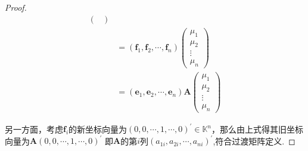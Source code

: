 {\begin{proof}
\begin{align*}
\begin{pmatrix}
                                                                         \end{pmatrix} \\
                        & =\left(\bm{f}_1,\bm{f}_2,\cdots,\bm{f}_n\right)
            \begin{pmatrix}
                \mu_1 \\\mu_2\\\vdots\\\mu_n
            \end{pmatrix}                                                                          \\
                        & =\left(\bm{e}_1,\bm{e}_2,\cdots,\bm{e}_n\right)\bm{A}
            \begin{pmatrix}
                \mu_1 \\\mu_2\\\vdots\\\mu_n
            \end{pmatrix}
        \end{align*}

        另一方面，考虑$\bm{f}_i$的新坐标向量为$\left(0,0,\cdots,1,\cdots,0\right)^{\prime}\in \mathbb{K}^n$，那么由上式得其旧坐标向量为$\bm{A}\left(0,0,\cdots,1,\cdots,0
            \right)^{\prime}
        $
        即$\bm{A}$的第$i$列$\left(
            a_{1i},a_{2i},\cdots,a_{ni}
            \right)^{\prime}$,符合过渡矩阵定义.
    \end{proof}
}
